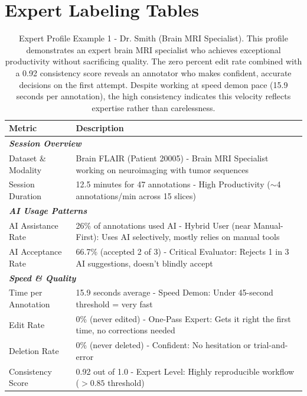 \documentclass{article}
\begin{document}
\section*{Expert Labeling Tables}

\begin{table}[H]
    \caption{Expert Profile Example 1 - Dr. Smith (Brain MRI Specialist). This profile demonstrates an expert brain MRI specialist who achieves exceptional productivity without sacrificing quality. The zero percent edit rate combined with a 0.92 consistency score reveals an annotator who makes confident, accurate decisions on the first attempt. Despite working at speed demon pace (15.9 seconds per annotation), the high consistency indicates this velocity reflects expertise rather than carelessness.}
    \centering
    \small
    \begin{tabular}{lp{10cm}}
        \toprule
        \textbf{Metric} & \textbf{Description} \\
        \midrule
        \multicolumn{2}{l}{\textit{\textbf{Session Overview}}} \\
        Dataset \& Modality & Brain FLAIR (Patient 20005) - Brain MRI Specialist working on neuroimaging with tumor sequences \\
        Session Duration & 12.5 minutes for 47 annotations - High Productivity ($\sim$4 annotations/min across 15 slices) \\
        \midrule
        \multicolumn{2}{l}{\textit{\textbf{AI Usage Patterns}}} \\
        AI Assistance Rate & 26\% of annotations used AI - Hybrid User (near Manual-First): Uses AI selectively, mostly relies on manual tools \\
        AI Acceptance Rate & 66.7\% (accepted 2 of 3) - Critical Evaluator: Rejects 1 in 3 AI suggestions, doesn't blindly accept \\
        \midrule
        \multicolumn{2}{l}{\textit{\textbf{Speed \& Quality}}} \\
        Time per Annotation & 15.9 seconds average - Speed Demon: Under 45-second threshold = very fast \\
        Edit Rate & 0\% (never edited) - One-Pass Expert: Gets it right the first time, no corrections needed \\
        Deletion Rate & 0\% (never deleted) - Confident: No hesitation or trial-and-error \\
        Consistency Score & 0.92 out of 1.0 - Expert Level: Highly reproducible workflow ($>0.85$ threshold) \\

\end{tabular}
\end{table}
\end{document}
